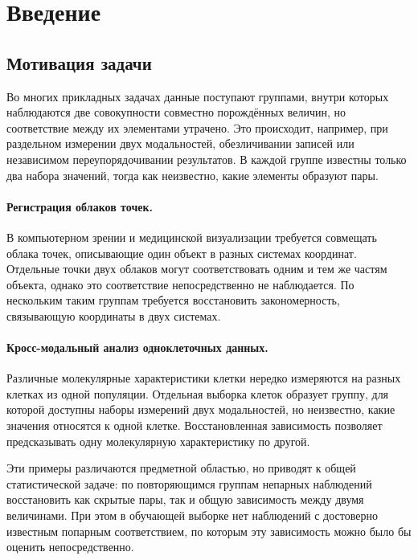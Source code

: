 \section{Введение}
\label{sec:Introduction} 

\subsection{Мотивация задачи}

Во многих прикладных задачах данные поступают группами, внутри которых наблюдаются две
совокупности совместно порождённых величин, но соответствие между их элементами утрачено.
Это происходит, например, при раздельном измерении двух модальностей, обезличивании записей
или независимом переупорядочивании результатов. В каждой группе известны только два набора
значений, тогда как неизвестно, какие элементы образуют пары.

\paragraph{Регистрация облаков точек.}
В компьютерном зрении и медицинской визуализации требуется совмещать облака точек,
описывающие один объект в разных системах координат. Отдельные точки двух облаков могут
соответствовать одним и тем же частям объекта, однако это соответствие непосредственно не
наблюдается. По нескольким таким группам требуется восстановить закономерность, связывающую
координаты в двух системах.

\paragraph{Кросс-модальный анализ одноклеточных данных.}
Различные молекулярные характеристики клетки нередко измеряются на разных клетках из одной
популяции. Отдельная выборка клеток образует группу, для которой доступны наборы измерений
двух модальностей, но неизвестно, какие значения относятся к одной клетке. Восстановленная
зависимость позволяет предсказывать одну молекулярную характеристику по другой.

Эти примеры различаются предметной областью, но приводят к общей статистической задаче:
по повторяющимся группам непарных наблюдений восстановить как скрытые пары, так и общую
зависимость между двумя величинами. При этом в обучающей выборке нет наблюдений с
достоверно известным попарным соответствием, по которым эту зависимость можно было бы
оценить непосредственно.

